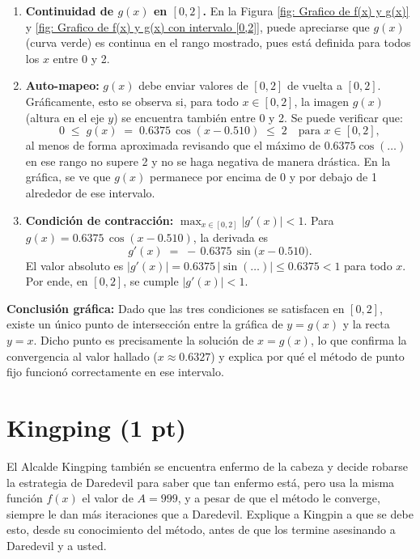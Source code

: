 \begin{enumerate}
  \item \textbf{Continuidad de \(g(x)\) en \([0,2]\).}
  En la Figura \ref{fig: Grafico de f(x) y g(x)} y \ref{fig: Grafico de f(x) y g(x) con intervalo [0,2]}, puede apreciarse que \(g(x)\) (curva verde) es continua en el rango mostrado, pues está definida para todos los \(x\) entre 0 y 2.

  \item \textbf{Auto-mapeo:} \(g(x)\) debe enviar valores de \([0,2]\) de vuelta a \([0,2]\).
  Gráficamente, esto se observa si, para todo \(x\in[0,2]\), la imagen \(g(x)\) (altura en el eje \(y\)) se encuentra también entre 0 y 2. Se puede verificar que:
  \[
    0 \;\le\; g(x) \;=\;0.6375 \,\cos(x-0.510) \;\le\;2
    \quad\text{para }x\in[0,2],
  \]
  al menos de forma aproximada revisando que el máximo de \(0.6375 \cos(\dots)\) en ese rango no supere 2 y no se haga negativa de manera drástica. En la gráfica, se ve que \(g(x)\) permanece por encima de 0 y por debajo de 1 alrededor de ese intervalo.

  \item \textbf{Condición de contracción:} \(\max_{x\in [0,2]} \lvert g'(x)\rvert < 1.\)
  Para \(g(x) = 0.6375\,\cos(x - 0.510)\), la derivada es
  \[
    g'(x) \;=\; -\,0.6375\,\sin\bigl(x - 0.510\bigr).
  \]
  El valor absoluto es \(\lvert g'(x)\rvert = 0.6375\,\lvert\sin(\dots)\rvert \le 0.6375 < 1\) para todo \(x\). Por ende, en \([0,2]\), se cumple \(\lvert g'(x)\rvert<1\).

\end{enumerate}

\noindent
\textbf{Conclusión gráfica:}  
Dado que las tres condiciones se satisfacen en \([0,2]\), existe un único punto de intersección entre la gráfica de \(y=g(x)\) y la recta \(y=x\). Dicho punto es precisamente la solución de \(x = g(x)\), lo que confirma la convergencia al valor hallado (\(x\approx 0.6327\)) y explica por qué el método de punto fijo funcionó correctamente en ese intervalo.

\section{Kingping (1 pt)}

El Alcalde Kingping también se encuentra enfermo de la cabeza y decide robarse
la estrategia de Daredevil para saber que tan enfermo está, pero usa la misma
función $f(x)$ el valor de $A=999$, y a pesar de que el método le converge,
siempre le dan más iteraciones que a Daredevil.
Explique a Kingpin a que se debe esto, desde su conocimiento del método, antes
de que los termine asesinando a Daredevil y a usted.


